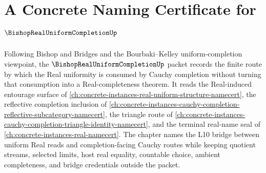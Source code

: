 \chapter{A Concrete Naming Certificate for $\BishopRealUniformCompletionUp$}
\label{ch:concrete-instances-bishop-real-uniform-completion-namecert}

Following Bishop and Bridges and the Bourbaki--Kelley uniform-completion viewpoint, the $\BishopRealUniformCompletionUp$ packet records the finite route by which the Real uniformity is consumed by Cauchy completion without turning that consumption into a Real-completeness theorem. It reads the Real-induced entourage surface of \autoref{ch:concrete-instances-real-uniform-structure-namecert}, the reflective completion inclusion of \autoref{ch:concrete-instances-cauchy-completion-reflective-subcategory-namecert}, the triangle route of \autoref{ch:concrete-instances-cauchy-completion-triangle-identity-namecert}, and the terminal real-name seal of \autoref{ch:concrete-instances-real-namecert}. The chapter names the L10 bridge between uniform Real reads and completion-facing Cauchy routes while keeping quotient streams, selected limits, host real equality, countable choice, ambient completeness, and bridge credentials outside the packet.

